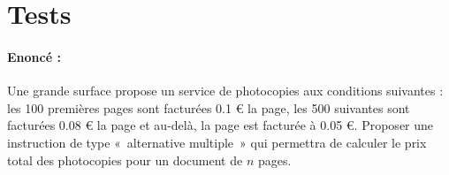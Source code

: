 \documentclass[11pt,a4paper,colorlinks,breaklinks]{article}
\begin{document}

%
%	
%
%

\newpage
{}
\section{Tests}

\paragraph{Enoncé :} 
Une grande surface propose un service de photocopies aux conditions suivantes :
les 100 premières pages sont facturées 0.1 \euro{} la page,
les 500 suivantes sont facturées 0.08 \euro{} la page
et au-delà, la page est facturée à 0.05 \euro{}.
Proposer une instruction de type «~alternative multiple~» 
qui permettra de calculer le prix total des photocopies pour un document 
de $n$ pages.

\paragraph{}\mbox{}\\
\noindent{}
\end{document}
